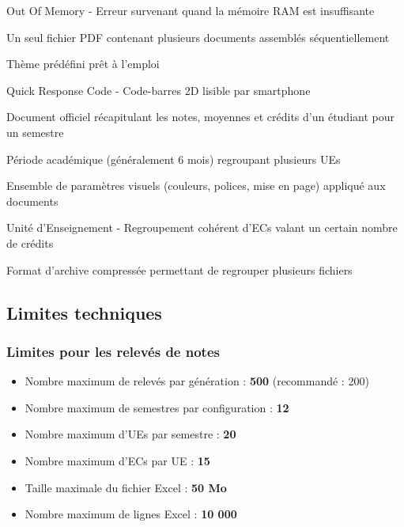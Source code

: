 \begin{description}[leftmargin=5cm, style=nextline]
    \item[OOM] Out Of Memory - Erreur survenant quand la mémoire RAM est insuffisante

    \item[PDF fusionné] Un seul fichier PDF contenant plusieurs documents assemblés séquentiellement

    \item[Préréglage] Thème prédéfini prêt à l'emploi

    \item[QR code] Quick Response Code - Code-barres 2D lisible par smartphone

    \item[Relevé de notes] Document officiel récapitulant les notes, moyennes et crédits d'un étudiant pour un semestre

    \item[Semestre] Période académique (généralement 6 mois) regroupant plusieurs UEs

    \item[Thème] Ensemble de paramètres visuels (couleurs, polices, mise en page) appliqué aux documents

    \item[UE] Unité d'Enseignement - Regroupement cohérent d'ECs valant un certain nombre de crédits

    \item[ZIP] Format d'archive compressée permettant de regrouper plusieurs fichiers
\end{description}

\subsection{Limites techniques}

\subsubsection{Limites pour les relevés de notes}

\begin{itemize}[leftmargin=*]
    \item Nombre maximum de relevés par génération : \textbf{500} (recommandé : 200)
    \item Nombre maximum de semestres par configuration : \textbf{12}
    \item Nombre maximum d'UEs par semestre : \textbf{20}
    \item Nombre maximum d'ECs par UE : \textbf{15}
    \item Taille maximale du fichier Excel : \textbf{50 Mo}
    \item Nombre maximum de lignes Excel : \textbf{10 000}
\end{itemize}

